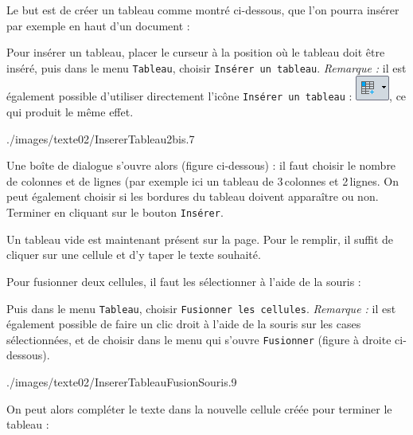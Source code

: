 Le but est de créer un tableau comme montré ci-dessous, que l'on pourra insérer par exemple en haut d'un document :



Pour insérer un tableau, placer le curseur à la position où le tableau doit être inséré, puis dans le menu \texttt{Tableau}, choisir \texttt{Insérer un tableau}. \emph{Remarque :} il est également possible d'utiliser directement l'icône \texttt{Insérer un tableau} : \includegraphics[width=.6cm]{./images/texte02/InsererTableauIcone}, ce qui produit le même effet.

  

%
                {./images/texte02/InsererTableau2bis}{.7\textwidth}  



Une boîte de dialogue s'ouvre alors (figure ci-dessous) : il faut choisir le nombre de colonnes et de lignes (par exemple ici un tableau de 3\,colonnes et 2\,lignes. On peut également choisir si les bordures du tableau doivent apparaître ou non. Terminer en cliquant sur le bouton \texttt{Insérer}.  


Un tableau vide est maintenant présent sur la page. Pour le remplir, il suffit de cliquer sur une cellule et d'y taper le texte souhaité.


Pour fusionner deux cellules, il faut les sélectionner à l'aide de la souris :


Puis dans le menu \texttt{Tableau}, choisir \texttt{Fusionner les cellules}. \emph{Remarque :} il est également possible de faire un clic droit à l'aide de la souris sur les cases sélectionnées, et de choisir dans le menu qui s'ouvre \texttt{Fusionner} (figure à droite ci-dessous).  

%
                {./images/texte02/InsererTableauFusionSouris}{.9\textwidth}  




On peut alors compléter le texte dans la nouvelle cellule créée pour terminer le tableau :

